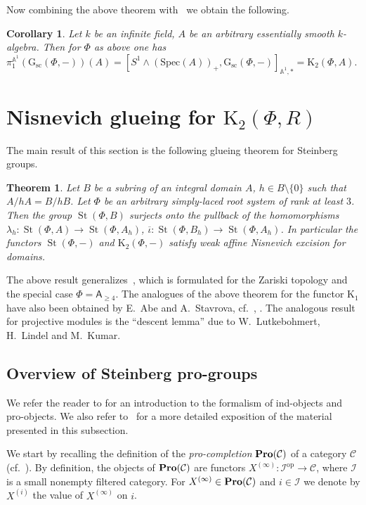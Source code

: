 \documentclass[oneside, 11pt]{amsart} \pdfoutput=1
\newcommand{\K}{{\mathrm{K}}}
\newcommand{\St}{\mathop{\mathrm{St}}\nolimits}
\newcommand{\Gsc}{\mathrm{G}_\mathrm{sc}}
\numberwithin{equation}{section}
\newtheorem{theorem}[lemma]{Theorem}
\newtheorem{corollary}[lemma]{Corollary}
\theoremstyle{definition}
\newcommand{\rA}{\mathsf{A}}
\newcommand{\catname}[1]{{\normalfont\textbf{#1}}} %
\begin{document}
Now combining the above theorem with~\cite[Theorem~4.3.1]{AHW18} we obtain the following.
\begin{corollary} \label{cor:motivic-pi1} Let $k$ be an infinite field, $A$ be an arbitrary essentially smooth $k$-algebra. Then for $\Phi$ as above one has $\pi_1^{\mathbb{A}^1}(\Gsc(\Phi, -))(A) = [S^1 \wedge (\mathrm{Spec}(A))_+, \Gsc(\Phi, -)]_{ \mathbb{A}^1,*} = \K_2(\Phi, A).$
\end{corollary}


\section{Nisnevich glueing for \texorpdfstring{$\K_2(\Phi, R)$}{K2(Ф,R)}} \label{sec:patching}
The main result of this section is the following glueing theorem for Steinberg groups.
\begin{theorem}\label{glueing}
Let $B$ be a subring of an integral domain $A$, $h\in B \setminus \{0\}$ such that $A / hA = B / hB$. Let $\Phi$ be an arbitrary simply-laced root system of rank at least $3$.
Then the group $\St(\Phi, B)$ surjects onto the pullback of the homomorphisms 
$\lambda_h\colon \St(\Phi, A) \to \St(\Phi, A_h)$, $\overline{\iota}\colon\St(\Phi, B_h) \to \St(\Phi, A_h)$. In particular the functors $\St(\Phi, -)$ and $\K_2(\Phi, -)$  satisfy weak affine Nisnevich excision for domains. \end{theorem}
The above result generalizes~\cite[Proposition~1.4]{Tu83}, which is formulated for the Zariski topology and the special case $\Phi=\rA_{\geq 4}$.
The analogues of the above theorem for the functor $\K_1$ have also been obtained by E.~Abe and A.~Stavrova, cf.~\cite[Lemma~3.7]{Abe83}, \cite[Lemma~3.4]{Sta14}.
The analogous result for projective modules is the ``descent lemma'' \cite[Lemma~4.7]{Bh99} due to W.~Lutkebohmert, H.~Lindel and M.~Kumar. 

\subsection{Overview of Steinberg pro-groups}
We refer the reader to \cite[Section~6.1]{SK06} for an introduction to the formalism of ind-objects and pro-objects. We also refer to~\cite[\S~2]{LSV20} for a more detailed exposition of the material presented in this subsection.

We start by recalling the definition of the {\it pro-completion} $\catname{Pro}(\mathcal{C})$ of a category $\mathcal{C}$ (cf.~\cite[\S~2.1]{LSV20}).
By definition, the objects of $\catname{Pro}(\mathcal{C})$ are functors $X^{(\infty)}\colon\mathcal{I}^{\mathrm{op}} \to \mathcal{C}$, where $\mathcal{I}$ is a small nonempty filtered category. For $X^{(\infty)} \in 
\catname{Pro}(\mathcal{C})$ and $i \in \mathcal{I}$ we denote by $X^{(i)}$ the value of $X^{(\infty)}$ on $i$. 
\end{document}
